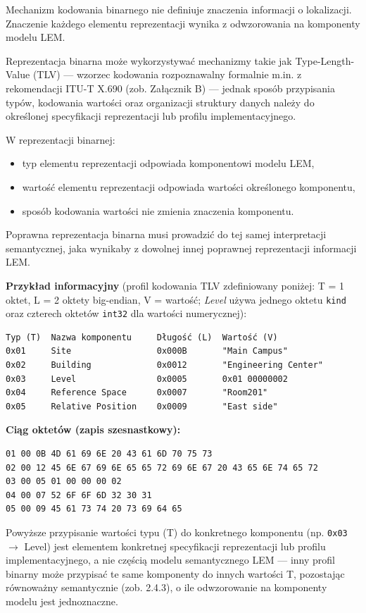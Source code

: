 Mechanizm kodowania binarnego nie definiuje znaczenia informacji o lokalizacji. Znaczenie każdego elementu reprezentacji wynika z odwzorowania na komponenty modelu LEM.

Reprezentacja binarna może wykorzystywać mechanizmy takie jak Type-Length-Value (TLV) --- wzorzec kodowania rozpoznawalny formalnie m.in. z rekomendacji ITU-T X.690 \cite{ITU-X690} (zob. Załącznik B) --- jednak sposób przypisania typów, kodowania wartości oraz organizacji struktury danych należy do określonej specyfikacji reprezentacji lub profilu implementacyjnego.

W reprezentacji binarnej:
\begin{itemize}
    \item typ elementu reprezentacji odpowiada komponentowi modelu LEM,
    \item wartość elementu reprezentacji odpowiada wartości określonego komponentu,
    \item sposób kodowania wartości nie zmienia znaczenia komponentu.
\end{itemize}

Poprawna reprezentacja binarna musi prowadzić do tej samej interpretacji semantycznej, jaka wynikaby z dowolnej innej poprawnej reprezentacji informacji LEM.

\noindent \textbf{Przykład informacyjny} (profil kodowania TLV zdefiniowany poniżej: T = 1 oktet, L = 2 oktety big-endian, V = wartość; \textit{Level} używa jednego oktetu \texttt{kind} oraz czterech oktetów \texttt{int32} dla wartości numerycznej):

\begin{verbatim}
Typ (T)  Nazwa komponentu     Długość (L)  Wartość (V)
0x01     Site                 0x000B       "Main Campus"
0x02     Building             0x0012       "Engineering Center"
0x03     Level                0x0005       0x01 00000002
0x04     Reference Space      0x0007       "Room201"
0x05     Relative Position    0x0009       "East side"
\end{verbatim}

\noindent \textbf{Ciąg oktetów (zapis szesnastkowy):}
\begin{verbatim}
01 00 0B 4D 61 69 6E 20 43 61 6D 70 75 73
02 00 12 45 6E 67 69 6E 65 65 72 69 6E 67 20 43 65 6E 74 65 72
03 00 05 01 00 00 00 02
04 00 07 52 6F 6F 6D 32 30 31
05 00 09 45 61 73 74 20 73 69 64 65
\end{verbatim}

Powyższe przypisanie wartości typu (T) do konkretnego komponentu (np. \texttt{0x03} $\rightarrow$ Level) jest elementem konkretnej specyfikacji reprezentacji lub profilu implementacyjnego, a nie częścią modelu semantycznego LEM --- inny profil binarny może przypisać te same komponenty do innych wartości T, pozostając równoważny semantycznie (zob. 2.4.3), o ile odwzorowanie na komponenty modelu jest jednoznaczne.


